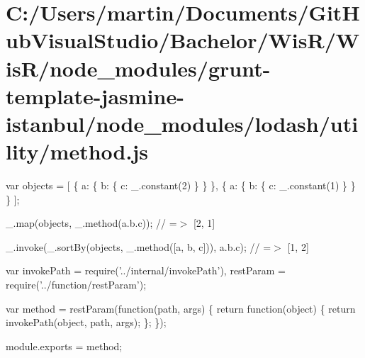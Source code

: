 \hypertarget{_c_1_2_users_2martin_2_documents_2_git_hub_visual_studio_2_bachelor_2_wis_r_2_wis_r_2node_modulecbe8edcd551e753408d52d618c728f25}{}\section{C\+:/\+Users/martin/\+Documents/\+Git\+Hub\+Visual\+Studio/\+Bachelor/\+Wis\+R/\+Wis\+R/node\+\_\+modules/grunt-\/template-\/jasmine-\/istanbul/node\+\_\+modules/lodash/utility/method.\+js}
var objects = \mbox{[} \{ \textquotesingle{}a\textquotesingle{}\+: \{ \textquotesingle{}b\textquotesingle{}\+: \{ \textquotesingle{}c\textquotesingle{}\+: \+\_\+.\+constant(2) \} \} \}, \{ \textquotesingle{}a\textquotesingle{}\+: \{ \textquotesingle{}b\textquotesingle{}\+: \{ \textquotesingle{}c\textquotesingle{}\+: \+\_\+.\+constant(1) \} \} \} \mbox{]};

\+\_\+.\+map(objects, \+\_\+.\+method(\textquotesingle{}a.\+b.\+c\textquotesingle{})); // =$>$ \mbox{[}2, 1\mbox{]}

\+\_\+.\+invoke(\+\_\+.\+sort\+By(objects, \+\_\+.\+method(\mbox{[}\textquotesingle{}a\textquotesingle{}, \textquotesingle{}b\textquotesingle{}, \textquotesingle{}c\textquotesingle{}\mbox{]})), \textquotesingle{}a.\+b.\+c\textquotesingle{}); // =$>$ \mbox{[}1, 2\mbox{]}


\begin{DoxyCodeInclude}
var invokePath = require(\textcolor{stringliteral}{'../internal/invokePath'}),
    restParam = require(\textcolor{stringliteral}{'../function/restParam'});

var method = restParam(\textcolor{keyword}{function}(path, args) \{
  \textcolor{keywordflow}{return} \textcolor{keyword}{function}(object) \{
    \textcolor{keywordflow}{return} invokePath(\textcolor{keywordtype}{object}, path, args);
  \};
\});

module.exports = method;
\end{DoxyCodeInclude}
 